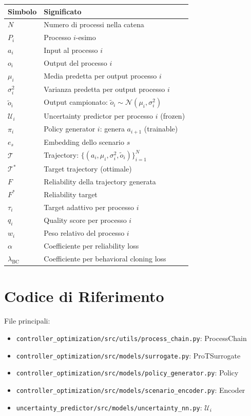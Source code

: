 \documentclass[11pt,a4paper]{article}
\begin{document}
\begin{table}[h]
\centering
\begin{tabular}{ll}
\toprule
\textbf{Simbolo} & \textbf{Significato} \\
\midrule
$N$ & Numero di processi nella catena \\
$P_i$ & Processo $i$-esimo \\
$a_i$ & Input al processo $i$ \\
$o_i$ & Output del processo $i$ \\
$\mu_i$ & Media predetta per output processo $i$ \\
$\sigma_i^2$ & Varianza predetta per output processo $i$ \\
$\tilde{o}_i$ & Output campionato: $\tilde{o}_i \sim \mathcal{N}(\mu_i, \sigma_i^2)$ \\
$\mathcal{U}_i$ & Uncertainty predictor per processo $i$ (frozen) \\
$\pi_i$ & Policy generator $i$: genera $a_{i+1}$ (trainable) \\
$e_s$ & Embedding dello scenario $s$ \\
$\mathcal{T}$ & Trajectory: $\{(a_i, \mu_i, \sigma_i^2, \tilde{o}_i)\}_{i=1}^N$ \\
$\mathcal{T}^*$ & Target trajectory (ottimale) \\
$F$ & Reliability della trajectory generata \\
$F^*$ & Reliability target \\
$\tau_i$ & Target adattivo per processo $i$ \\
$q_i$ & Quality score per processo $i$ \\
$w_i$ & Peso relativo del processo $i$ \\
$\alpha$ & Coefficiente per reliability loss \\
$\lambda_{\text{BC}}$ & Coefficiente per behavioral cloning loss \\
\bottomrule
\end{tabular}
\end{table}

\section{Codice di Riferimento}

File principali:
\begin{itemize}
    \item \texttt{controller\_optimization/src/utils/process\_chain.py}: ProcessChain
    \item \texttt{controller\_optimization/src/models/surrogate.py}: ProTSurrogate
    \item \texttt{controller\_optimization/src/models/policy\_generator.py}: Policy
    \item \texttt{controller\_optimization/src/models/scenario\_encoder.py}: Encoder
    \item \texttt{uncertainty\_predictor/src/models/uncertainty\_nn.py}: $\mathcal{U}_i$
\end{itemize}
\end{document}
